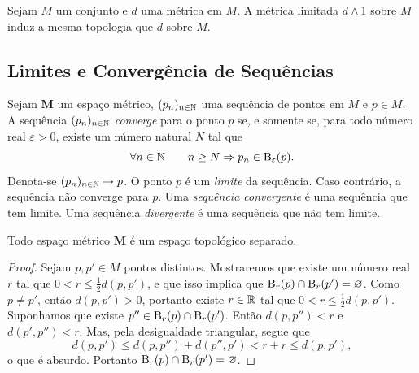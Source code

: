 \begin{exerc}
Sejam $M$ um conjunto e $d$ uma métrica em $M$. A métrica limitada $d \wedge 1$ sobre $M$ induz a mesma topologia que $d$ sobre $M$.
\end{exerc}

\subsection{Limites e Convergência de Sequências}

\begin{defi}
Sejam $\bm M$ um espaço métrico, $(p_n)_{n \in \mathbb{N}}$ uma sequência de pontos em $M$ e $p \in M$. A sequência $(p_n)_{n \in \mathbb{N}}$  \emph{converge} para o ponto $p$ se, e somente se, para todo número real $\varepsilon > 0$, existe um número natural $N$ tal que
	\begin{equation*}
	\forall n \in \mathbb{N} \qquad n \geq N \Rightarrow p_n \in \mathrm{B}_\varepsilon(p).
	\end{equation*}
Denota-se $(p_n)_{n \in \mathbb{N}} \rightarrow p$. O ponto $p$ é um \emph{limite} da sequência.  Caso contrário, a sequência não converge para $p$. Uma \emph{sequência convergente} é uma sequência que tem limite. Uma sequência \emph{divergente} é uma sequência que não tem limite.
\end{defi}

\begin{prop}
Todo espaço métrico $\bm M$ é um espaço topológico separado.
\end{prop}
\begin{proof}
Sejam $p,p' \in M$ pontos distintos. Mostraremos que existe um número real $r$ tal que $0 < r \leq \frac{1}{2} d(p,p')$, e que isso implica que $\mathrm{B}_r(p) \cap \mathrm{B}_r(p') = \varnothing$. Como $p \neq p'$, então $d(p,p') > 0$, portanto existe $r \in \mathbb{R}$ tal que $0 < r \leq \frac{1}{2} d(p,p')$. Suponhamos que existe $p'' \in \mathrm{B}_r(p) \cap \mathrm{B}_r(p')$. Então $d(p,p'')<r$ e $d(p',p'')<r$. Mas, pela desigualdade triangular, segue que
	\begin{equation*}
	d(p,p') \leq d(p,p'') + d(p'',p') < r + r \leq d(p,p'),
	\end{equation*}
o que é absurdo. Portanto $\mathrm{B}_r(p) \cap \mathrm{B}_r(p') = \varnothing$.
\end{proof}

